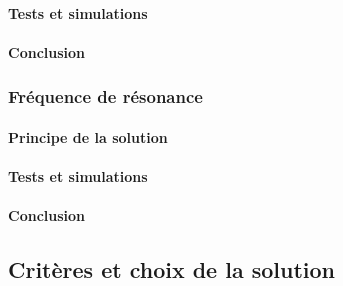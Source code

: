 \paragraph{Tests et simulations}

\paragraph{Conclusion}

\subsubsection{Fréquence de résonance}
\paragraph{Principe de la solution}

\paragraph{Tests et simulations}

\paragraph{Conclusion}


\subsection{Critères et choix de la solution}
